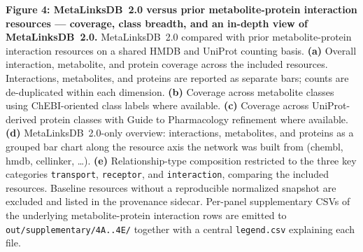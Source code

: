 \textbf{Figure 4: MetaLinksDB~2.0 versus prior metabolite-protein interaction resources --- coverage, class breadth, and an in-depth view of MetaLinksDB~2.0.}
MetaLinksDB~2.0 compared with prior metabolite-protein interaction resources on a shared HMDB and UniProt counting basis.
\textbf{(a)} Overall interaction, metabolite, and protein coverage across the included resources. Interactions, metabolites, and proteins are reported as separate bars; counts are de-duplicated within each dimension.
\textbf{(b)} Coverage across metabolite classes using ChEBI-oriented class labels where available.
\textbf{(c)} Coverage across UniProt-derived protein classes with Guide to Pharmacology refinement where available.
\textbf{(d)} MetaLinksDB~2.0-only overview: interactions, metabolites, and proteins as a grouped bar chart along the resource axis the network was built from (chembl, hmdb, cellinker, …).
\textbf{(e)} Relationship-type composition restricted to the three key categories \texttt{transport}, \texttt{receptor}, and \texttt{interaction}, comparing the included resources.
Baseline resources without a reproducible normalized snapshot are excluded and listed in the provenance sidecar. Per-panel supplementary CSVs of the underlying metabolite-protein interaction rows are emitted to \texttt{out/supplementary/4A..4E/} together with a central \texttt{legend.csv} explaining each file.
